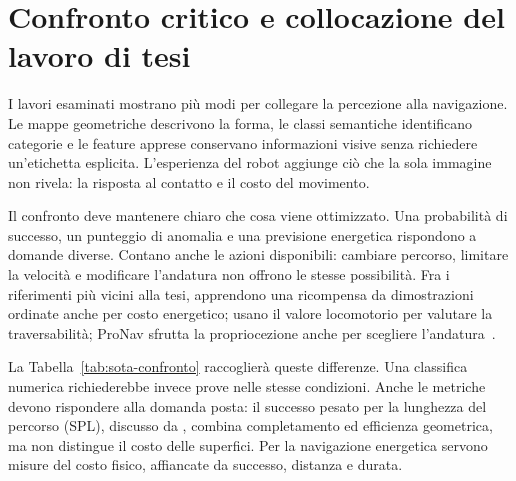\section{Confronto critico e collocazione del lavoro di tesi}
\label{sec:sota-confronto}

I lavori esaminati mostrano più modi per collegare la percezione alla navigazione. Le mappe geometriche descrivono la forma, le classi semantiche identificano categorie e le feature apprese conservano informazioni visive senza richiedere un'etichetta esplicita. L'esperienza del robot aggiunge ciò che la sola immagine non rivela: la risposta al contatto e il costo del movimento.

Il confronto deve mantenere chiaro che cosa viene ottimizzato. Una probabilità di successo, un punteggio di anomalia e una previsione energetica rispondono a domande diverse. Contano anche le azioni disponibili: cambiare percorso, limitare la velocità e modificare l'andatura non offrono le stesse possibilità. Fra i riferimenti più vicini alla tesi, \citet{Gan2022Energy} apprendono una ricompensa da dimostrazioni ordinate anche per costo energetico; \citet{Zhang2026Traversability} usano il valore locomotorio per valutare la traversabilità; ProNav sfrutta la propriocezione anche per scegliere l'andatura~\citep{Elnoor2024ProNav}.

\begin{table}[tbp]
    \centering
    \caption[Criteri di confronto fra i metodi di navigazione]{Confronto qualitativo dei metodi. Per ciascun lavoro si distinguono le informazioni usate, la quantità ottimizzata e le decisioni che il sistema può prendere.}
    \label{tab:sota-confronto}
\end{table}

La Tabella~\ref{tab:sota-confronto} raccoglierà queste differenze. Una classifica numerica richiederebbe invece prove nelle stesse condizioni. Anche le metriche devono rispondere alla domanda posta: il successo pesato per la lunghezza del percorso (SPL), discusso da \citet{Anderson2018Evaluation}, combina completamento ed efficienza geometrica, ma non distingue il costo delle superfici. Per la navigazione energetica servono misure del costo fisico, affiancate da successo, distanza e durata.

